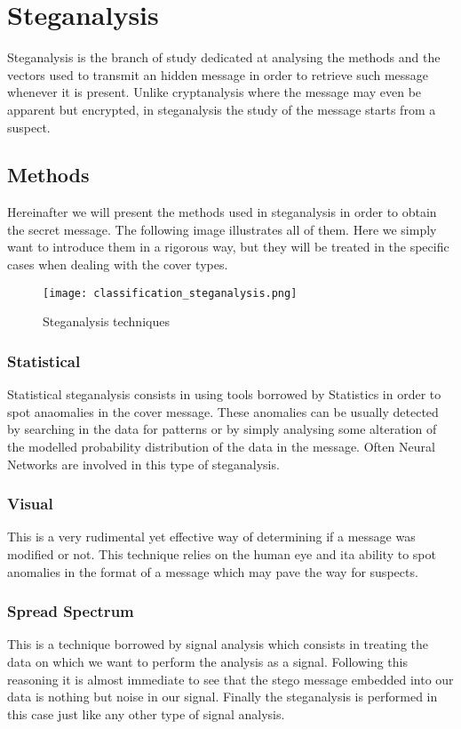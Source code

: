 \documentclass[../../main.tex]{subfiles}
\begin{document}
    
    \section{Steganalysis}
    Steganalysis is the branch of study dedicated at analysing the methods and
    the vectors used to transmit an hidden message in order to retrieve such
    message whenever it is present.
    Unlike cryptanalysis where the message may even be apparent but encrypted,
    in steganalysis the study of the message starts from a suspect.
    \subsection{Methods}
    Hereinafter we will present the methods used in steganalysis in
    order to obtain the secret message. The following image illustrates all of them. Here we simply want to introduce them in a rigorous way, but they will be treated 
    in the specific cases when dealing with the cover types.

    \begin{figure}[h]
        \centering
        \caption{Steganalysis techniques}
        \texttt{[image: classification\_steganalysis.png]}
    \end{figure}


    \subsubsection{Statistical}
    Statistical steganalysis consists in using tools borrowed by Statistics in order to spot anaomalies in the cover message.
    These anomalies can be usually detected by searching in the data for patterns or by simply analysing some alteration of the modelled
    probability distribution of the data in the message. Often Neural Networks are involved in this type of steganalysis.

    \subsubsection{Visual}
    This is a very rudimental yet effective way of determining if a message was modified or not. This technique relies on the human eye and ita ability
    to spot anomalies in the format of a message which may pave the way for suspects.
    
    \subsubsection{Spread Spectrum}
    This is a technique borrowed by signal analysis which consists in treating the data on which we want to perform the analysis as a signal.
    Following this reasoning it is almost immediate to see that the stego message embedded into our data is nothing but noise in our signal. Finally the steganalysis
    is performed in this case just like any other type of signal analysis.
\end{document}
